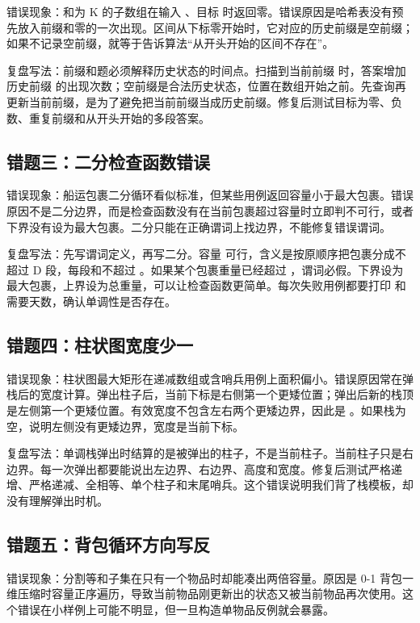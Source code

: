 错误现象：和为 K 的子数组在输入 \code{[3]}、目标  时返回零。错误原因是哈希表没有预先放入前缀和零的一次出现。区间从下标零开始时，它对应的历史前缀是空前缀；如果不记录空前缀，就等于告诉算法“从开头开始的区间不存在”。

复盘写法：前缀和题必须解释历史状态的时间点。扫描到当前前缀  时，答案增加历史前缀  的出现次数；空前缀是合法历史状态，位置在数组开始之前。先查询再更新当前前缀，是为了避免把当前前缀当成历史前缀。修复后测试目标为零、负数、重复前缀和从开头开始的多段答案。

\subsection{错题三：二分检查函数错误}

错误现象：船运包裹二分循环看似标准，但某些用例返回容量小于最大包裹。错误原因不是二分边界，而是检查函数没有在当前包裹超过容量时立即判不可行，或者下界没有设为最大包裹。二分只能在正确谓词上找边界，不能修复错误谓词。

复盘写法：先写谓词定义，再写二分。容量  可行，含义是按原顺序把包裹分成不超过 D 段，每段和不超过 。如果某个包裹重量已经超过 ，谓词必假。下界设为最大包裹，上界设为总重量，可以让检查函数更简单。每次失败用例都要打印  和需要天数，确认单调性是否存在。

\subsection{错题四：柱状图宽度少一}

错误现象：柱状图最大矩形在递减数组或含哨兵用例上面积偏小。错误原因常在弹栈后的宽度计算。弹出柱子后，当前下标是右侧第一个更矮位置；弹出后新的栈顶是左侧第一个更矮位置。有效宽度不包含左右两个更矮边界，因此是 。如果栈为空，说明左侧没有更矮边界，宽度是当前下标。

复盘写法：单调栈弹出时结算的是被弹出的柱子，不是当前柱子。当前柱子只是右边界。每一次弹出都要能说出左边界、右边界、高度和宽度。修复后测试严格递增、严格递减、全相等、单个柱子和末尾哨兵。这个错误说明我们背了栈模板，却没有理解弹出时机。

\subsection{错题五：背包循环方向写反}

错误现象：分割等和子集在只有一个物品时却能凑出两倍容量。原因是 0-1 背包一维压缩时容量正序遍历，导致当前物品刚更新出的状态又被当前物品再次使用。这个错误在小样例上可能不明显，但一旦构造单物品反例就会暴露。

